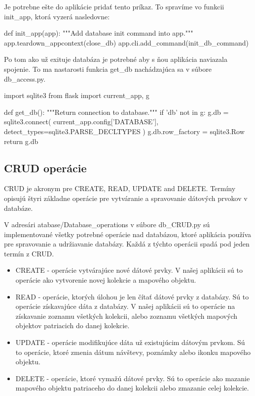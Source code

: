 Je potrebne ešte do aplikácie pridať tento príkaz. To spravíme vo funkcii init\_app, ktorá vyzerá nasledovne: 
\begin{code}
      def init_app(app):
      """Add database init command into app."""
      app.teardown_appcontext(close_db)
      app.cli.add_command(init_db_command)
\end{code}

Po tom ako už exituje databáza je potrebné aby s ňou aplikácia naviazala spojenie. To ma nastarosti funkcia get\_db nachádzajúca sa v súbore db\_access.py. 

\begin{code}
import sqlite3
from flask import current_app, g

def get_db():
    """Return connection to database."""
    if 'db' not in g:
        g.db = sqlite3.connect(
            current_app.config['DATABASE'],
            detect_types=sqlite3.PARSE_DECLTYPES
        )
        g.db.row_factory = sqlite3.Row
    return g.db
\end{code}

\subsection*{CRUD operácie}
CRUD je akronym pre CREATE, READ, UPDATE and DELETE. Termíny opisujú štyri základne operácie pre vytváranie a spravovanie dátových prvokov v databáze. 

V adresári atabase/Database\_operations v súbore db\_CRUD.py sú implementované všetky potrebné operácie nad databázou, ktoré aplikácia používa pre spravovanie a udržiavanie databázy. Každá z týchto operácii spadá pod jeden termín z CRUD. 

\begin{itemize}
      \item CREATE - operácie vytvárajúce nové dátové prvky. V našej aplikácii sú to operácie ako vytvorenie novej kolekcie a mapového objektu. 
      \item READ - operácie, ktorých úlohou je len čítať dátové prvky z databázy. Sú to operácie získavajúce dáta z databázy. V našej aplikácii sú to operácie na získavanie 
            zoznamu všetkých kolekcii, alebo zoznamu všetkých mapových objektov patriacich do danej kolekcie. 
      \item UPDATE - operácie modifikujúce dáta už existujúcim dátovým prvkom. Sú to operácie, ktoré zmenia dátum návštevy, poznámky alebo ikonku mapového objektu. 
      \item DELETE - operácie, ktoré vymažú dátové prvky. Sú to operácie ako mazanie mapového objektu patriaceho do danej kolekcii alebo zmazanie celej kolekcie. 
\end{itemize}

